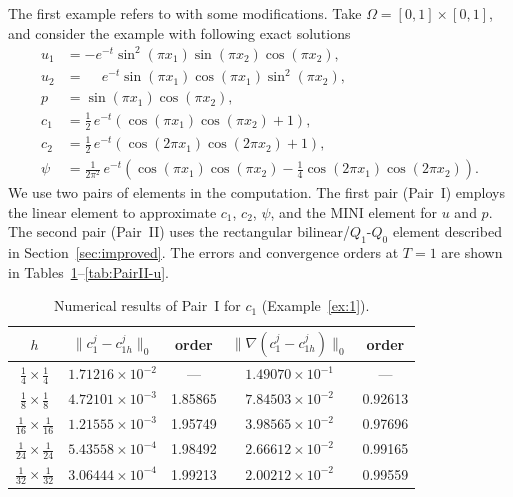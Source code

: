 \begin{example}
\label{ex:1}
The first example refers to \cite{Gao2017} with some modifications. Take
$\Omega = [0,1]\times[0,1]$, and consider the example with following exact solutions
\begin{align}
  u_{1} &= -e^{-t}\sin^{2}(\pi x_{1})\sin(\pi x_{2})\cos(\pi x_{2}),
  \label{eq:ex1-u1}\\
  u_{2} &= \phantom{-}e^{-t}\sin(\pi x_{1})\cos(\pi x_{1})\sin^{2}(\pi x_{2}),
  \label{eq:ex1-u2}\\
  p     &= \sin(\pi x_{1})\cos(\pi x_{2}),
  \label{eq:ex1-p}\\
  c_{1} &= \frac{1}{2}\,e^{-t}\!\left(\cos(\pi x_{1})\cos(\pi x_{2}) + 1\right),
  \label{eq:ex1-c1}\\
  c_{2} &= \frac{1}{2}\,e^{-t}\!\left(\cos(2\pi x_{1})\cos(2\pi x_{2}) + 1\right),
  \label{eq:ex1-c2}\\
  \psi  &= \frac{1}{2\pi^{2}}\,e^{-t}\!\left(
             \cos(\pi x_{1})\cos(\pi x_{2})
             - \frac{1}{4}\cos(2\pi x_{1})\cos(2\pi x_{2})
           \right).
  \label{eq:ex1-psi}
\end{align}
We use two pairs of elements in the computation. The first pair (Pair~I) employs the linear
element to approximate $c_{1}$, $c_{2}$, $\psi$, and the MINI element for $u$ and $p$. The
second pair (Pair~II) uses the rectangular bilinear/$Q_{1}$-$Q_{0}$ element described in
Section~\ref{sec:improved}. The errors and convergence orders at $T = 1$ are shown in
Tables~\ref{tab:PairI-c1}--\ref{tab:PairII-u}.
\end{example}


\begin{table}[htbp]
\centering
\caption{Numerical results of Pair~I for $c_{1}$ (Example~\ref{ex:1}).}
\label{tab:PairI-c1}
\begin{tabular}{ccccc}
\hline
$h$ &
$\|c_{1}^{j} - c_{1h}^{j}\|_{0}$ & order &
$\|\nabla(c_{1}^{j} - c_{1h}^{j})\|_{0}$ & order \\
\hline
$\tfrac{1}{4} \times \tfrac{1}{4}$   & $1.71216\times10^{-2}$ & ---     & $1.49070\times10^{-1}$ & ---     \\
$\tfrac{1}{8} \times \tfrac{1}{8}$   & $4.72101\times10^{-3}$ & 1.85865 & $7.84503\times10^{-2}$ & 0.92613 \\
$\tfrac{1}{16}\times \tfrac{1}{16}$  & $1.21555\times10^{-3}$ & 1.95749 & $3.98565\times10^{-2}$ & 0.97696 \\
$\tfrac{1}{24}\times \tfrac{1}{24}$  & $5.43558\times10^{-4}$ & 1.98492 & $2.66612\times10^{-2}$ & 0.99165 \\
$\tfrac{1}{32}\times \tfrac{1}{32}$  & $3.06444\times10^{-4}$ & 1.99213 & $2.00212\times10^{-2}$ & 0.99559 \\
\hline
\end{tabular}
\end{table}

